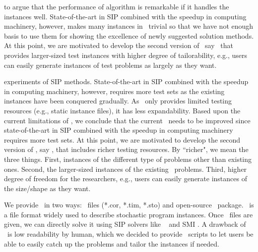 to argue that the performance of algorithm is remarkable if it handles the instances well. 
State-of-the-art in SIP combined with the speedup in computing machinery, however, makes many 
instances in \siplib\ trivial so that we have not enough basis to use them for showing the 
excellence of newly suggested solution methods. At this point, we are motivated to develop 
the second version of \siplib\, say \siplibtwo\ that provides larger-sized test instances 
with higher degree of tailorability, e.g., users can easily generate instances of test 
problems as largely as they want.%

experiments of SIP methods. State-of-the-art in SIP combined with the speedup in computing 
machinery, however, requires more test sets as the existing instances have been conquered 
gradually. As \siplib\ only provides limited testing resources (e.g., static instance files), 
it has less expandability. 
Based upon the current limitations of \siplib, we conclude that the current \siplib\ needs to 
be improved since state-of-the-art in SIP combined with the speedup in computing machinery 
requires more test sets. At this point, we are motivated to develop the second version of 
\siplib, say \siplibtwo, that includes richer testing resources. By ``richer", we mean the 
three things. First, instances of the different type of problems other than existing ones. 
Second, the larger-sized instances of the existing \siplib\ problems. Third, higher degree of 
freedom for the researchers, e.g., users can easily generate instances of the size/shape as 
they want.

We provide \siplibtwo\ in two ways: \smps\ files (*.cor, *.tim, *.sto) and open-source 
\julia\ package. \smps\ is a file format widely used to describe stochastic program 
instances. Once \smps\ files are given, we can directly solve it using SIP solvers like \dsp\ 
\cite{web:DSP} and \textsf{SMI} \cite{web:SMI}. A drawback of \smps\ is low 
readability by human, which we decided to provide \julia\ scripts to let users be able to 
easily catch up the problems and tailor the instances if needed.

